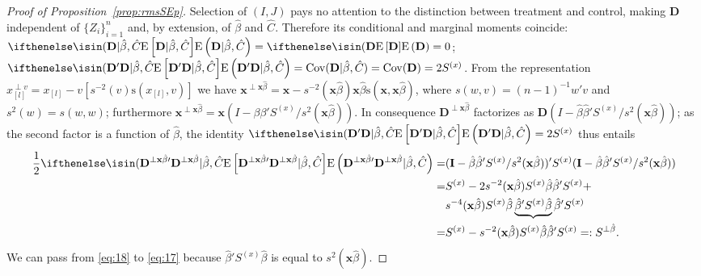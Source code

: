 \documentclass{article}
\theoremstyle{remark}
\begin{document}
\begin{proof}[Proof of Proposition~\ref{prop:rmsSEp}]
Selection of $(I, J)$ pays no attention to the distinction between treatment and control, making $\mathbf{D}$ independent of $\{Z_{i}\}_{i=1}^{n}$ and, by extension, of $\hat{\beta}$ and $\hat{C}$.  Therefore its conditional and marginal moments coincide: $\E{\mathbf{D}| \hat\beta, \hat{C} } = \E{\mathbf{D}} = 0$; $ \E{\mathbf{D}'\mathbf{D}| \hat\beta, \hat{C} } = \mathrm{Cov}(\mathbf{D}| \hat\beta, \hat{C}) = \mathrm{Cov}(\mathbf{D} ) = 2S^{(x)}$.   
From the representation $x_{[l]}^{\perp v} = x_{[l]} - v[s^{-2}(v) \mathrm{s}(x_{[l]}, v)] $  we have 
$\mathbf{x}^{\perp \mathbf{x}\hat{\beta}} = \mathbf{x} - s^{-2}(\mathbf{x}\hat{\beta}) \mathbf{x}\hat{\beta} \mathrm{s}(\mathbf{x}, \mathbf{x}\hat{\beta}) $, where $ s(w, v) = (n-1)^{-1}w'v$ and $s^{2}(w) = s(w,w)$; furthermore $\mathbf{x}^{\perp \mathbf{x}\hat{\beta}} = \mathbf{x} (I - \beta\beta' S^{(x)}/s^{2}(\mathbf{x}\hat{\beta})) $.  
In consequence $\mathbf{D}^{\perp \mathbf{x}\hat{\beta}}$  factorizes as $\mathbf{D} (I - \hat\beta\hat\beta' S^{(x)}/s^{2}(\mathbf{x}\hat{\beta}))$; as the second factor is a function of $\hat{\beta}$, the identity $\E{\mathbf{D}'\mathbf{D}| \hat\beta, \hat{C}} = 2 S^{(x)}$ thus entails
\begin{align}
\frac{1}{2}\E{\mathbf{D}^{\perp \mathbf{x}\hat{\beta}\prime}\mathbf{D}^{\perp \mathbf{x}\hat{\beta}} | \hat\beta, \hat{C}}
=&  (\mathbf{I} - \hat\beta\hat\beta' S^{(x)}/s^{2}(\mathbf{x}\hat{\beta}))'S^{(x)} (\mathbf{I} - \hat\beta\hat\beta' S^{(x)}/s^{2}(\mathbf{x}\hat{\beta})) \nonumber \\
=&  S^{(x)} - 2s^{-2}(\mathbf{x}\hat{\beta})S^{(x)}\hat\beta\hat\beta'S^{(x)} + \nonumber \\
 & s^{-4}(\mathbf{x}\hat{\beta}) S^{(x)}\hat{\beta}\underbrace{\hat{\beta}'S^{(x)}\hat{\beta}}\hat{\beta}' S^{(x)} \label{eq:18} \\
=&  S^{(x)} - s^{-2}(\mathbf{x}\hat{\beta})S^{(x)}\hat\beta\hat\beta'S^{(x)} =: S^{\perp \hat{\beta}}. \label{eq:17}
\end{align} 
We can pass from \eqref{eq:18} to \eqref{eq:17} because $\hat{\beta}'S^{(x)}\hat{\beta}$ is equal to $s^{2}(\mathbf{x}\hat{\beta})$.


\end{proof}
\end{document}
